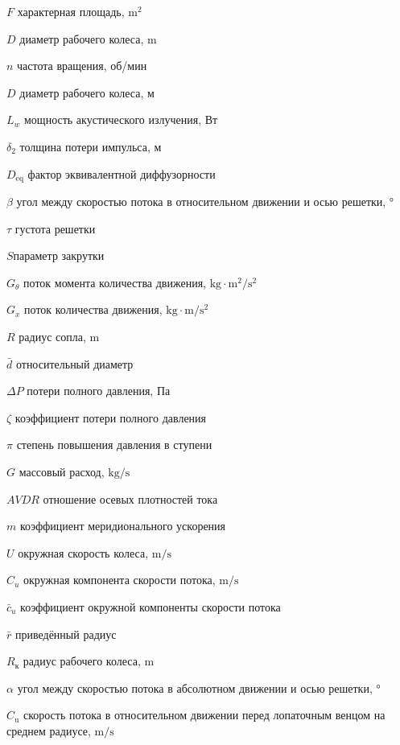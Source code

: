 \begin{eqexpl}
\item{\(F\)} характерная площадь, \(\si{\meter}^2\)
\item{\(D\)} диаметр рабочего колеса, \(\si\meter\)
\item{\(n\)} частота вращения, об/мин
\item{\(D\)} диаметр рабочего колеса, м
\item{\( L_w \)} мощность акустического излучения, Вт
\item{$\delta_{2}$} толщина потери импульса, м
\item{$D_\text{eq}$} фактор эквивалентной диффузорности
\item{$\beta$} угол между скоростью потока в относительном движении и осью решетки, \(\si\degree\)
\item{$\tau$} густота решетки
\item{$S$}параметр закрутки
\item{\(G_\theta\)} поток момента количества движения, \(\si\kilogram \cdot \si\meter^2/\si\second^2\)
\item{\(G_x\)} поток количества движения, \(\si\kilogram \cdot \si\meter/\si\second^2\)
\item{\(R\)} радиус сопла, \(\si\meter\)
\item{$\bar{d}$} относительный диаметр
\item{\(\Delta P\)} потери полного давления, Па
\item{$\zeta$} коэффициент потери полного давления
\item{\(\pi\)} степень повышения давления в ступени
\item{\(G\)} массовый расход, \(\si\kilogram/\si\second\)
\item{\(AVDR\)} отношение осевых плотностей тока
\item{\(m\)} коэффициент меридионального ускорения
\item{\(U\)} окружная скорость колеса, \(\si\meter/\si\second\)
\item{\(C_{u}\)} окружная компонента скорости потока, \(\si\meter/\si\second\)
\item{\(\bar{c}_{u}\)} коэффициент окружной компоненты скорости потока
\item{\(\bar{r}\)} приведённый радиус
\item{\(R_\text{к}\)} радиус рабочего колеса, \(\si\meter\)
\item{$\alpha$} угол между скоростью потока в абсолютном движении и осью решетки, \(\si\degree\)
\item{\(C_{\text{u}}\)} скорость потока в относительном движении перед лопаточным венцом на среднем радиусе, $\si\meter/\si\second$

\end{eqexpl}
